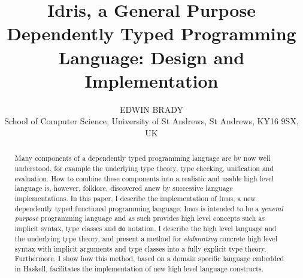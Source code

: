 \documentclass{jfp1}
\title
[Idris, a General Purpose Dependently Typed Programming Language]
{Idris, a General Purpose Dependently Typed Programming Language:
Design and Implementation}
\author[Edwin Brady]
{EDWIN BRADY\\
School of Computer Science, University of St Andrews, St Andrews,
KY16 9SX, UK}
\newcounter{per}
\newcommand{\Idris}{\textsc{Idris}}
\begin{document}
\maketitle

\begin{abstract}
Many components of a dependently typed programming language are by now well
understood, for example the underlying type theory, type checking, unification and
evaluation.  How to combine these components into a realistic and usable high
level language is, however, folklore, discovered anew by successive
language implementations.  In this paper, I describe the implementation of 
\Idris{}, a new dependently typed functional programming language.
\Idris{} is intended to be a \emph{general purpose} programming language
and as such provides high level concepts such as implicit syntax, 
type classes and \texttt{do} notation. 
I describe the high level language and the underlying type theory, and present
a method for \emph{elaborating} concrete high level syntax with implicit
arguments and type classes into a fully explicit type theory. Furthermore,
I show how this method,
based on a domain specific language embedded in Haskell, facilitates the
implementation of new high level language constructs.

\end{abstract}







%
\end{document}

